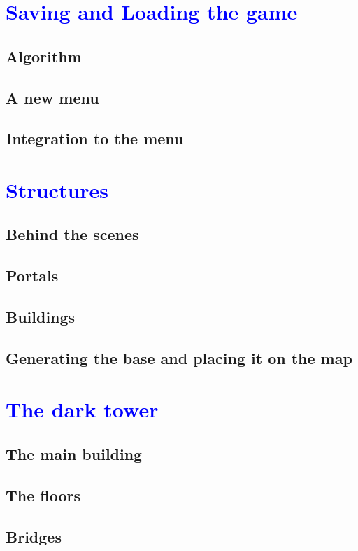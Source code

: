 \documentclass[article]{report}             %
\begin{document}
		\chapter{\textcolor{blue}{Saving and Loading the game}}
			\section{Algorithm}
			\section{A new menu}
			\section{Integration to the menu}

		\chapter{\textcolor{blue}{Structures}}
			\section{Behind the scenes}
			\section{Portals}
			\section{Buildings}
			\section{Generating the base and placing it on the map}

		\chapter{\textcolor{blue}{The dark tower}}
			\section{The main building}
			\section{The floors}
			\section{Bridges}
\end{document}
